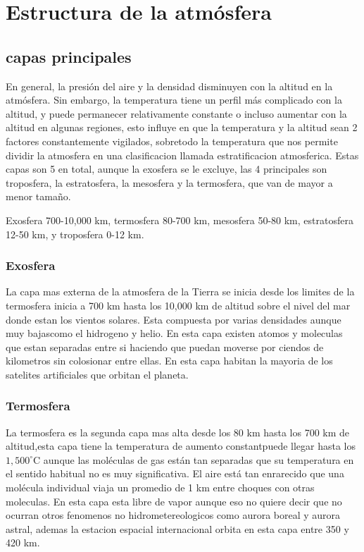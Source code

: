 \documentclass{article}
\begin{document}
\section{Estructura de la atmósfera}
\subsection{capas principales}
En general, la presión del aire y la densidad disminuyen con la altitud en la atmósfera. Sin embargo, la temperatura tiene un perfil más complicado con la altitud, y puede permanecer relativamente constante o incluso aumentar con la altitud en algunas regiones, esto influye en que la temperatura y la altitud sean 2 factores constantemente vigilados, sobretodo la temperatura que nos permite dividir la atmosfera en una clasificacion llamada estratificacion atmosferica. Estas capas son 5 en total, aunque la exosfera se le excluye, las 4 principales son  troposfera, la estratosfera, la mesosfera y la termosfera, que van de mayor a menor tamaño.

Exosfera 700-10,000 km, termosfera 80-700 km, mesosfera 50-80 km, estratosfera 12-50 km, y troposfera 0-12 km.

\subsubsection{Exosfera}
La capa mas externa de la atmosfera de la Tierra se inicia desde los limites de la termosfera inicia a 700 km hasta los 10,000 km de altitud sobre el nivel del mar donde estan los vientos solares. Esta compuesta por varias densidades aunque muy bajascomo el hidrogeno y helio. En esta capa existen atomos y moleculas que estan separadas entre si haciendo que puedan moverse por ciendos de kilometros sin colosionar entre ellas. En esta capa habitan la mayoria de los satelites artificiales que orbitan el planeta.

\subsubsection{Termosfera}
La termosfera es la segunda capa mas alta desde los 80 km hasta los 700 km de altitud,esta capa tiene la temperatura de aumento constantpuede llegar hasta los $1,500^{\circ}$C aunque las moléculas de gas están tan separadas que su temperatura en el sentido habitual no es muy significativa. El aire está tan enrarecido que una molécula individual viaja un promedio de 1 km entre choques con otras moleculas. En esta capa esta libre de vapor aunque eso no quiere decir que no ocurran otros fenomenos no hidrometereologicos como aurora boreal y aurora astral, ademas la estacion espacial internacional orbita en esta capa entre 350 y 420 km.
\end{document}
